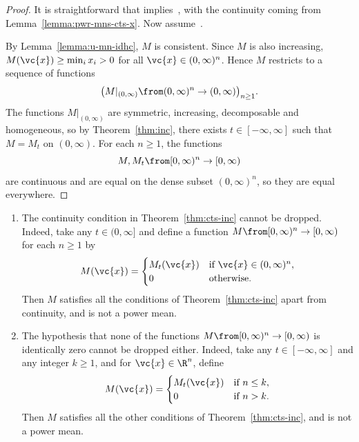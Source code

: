 \begin{proof}
It is straightforward that 
implies~, with the continuity coming from
Lemma~\ref{lemma:pwr-mns-cts-x}.  Now assume~.

By Lemma~\ref{lemma:u-mn-idhc}, $M$ is consistent.  Since $M$ is also
increasing, $M(\vc{x}) \geq \min_i x_i > 0$ for all $\vc{x} \in (0,
\infty)^n$.  Hence $M$ restricts to a sequence of functions
\[
\bigl( 
M|_{(0, \infty)} \from (0, \infty)^n \to (0, \infty) 
\bigr)_{n \geq 1}.
\]
The functions $M|_{(0, \infty)}$ are symmetric, increasing, decomposable
and homogeneous, so by Theorem~\ref{thm:inc}, there exists $t \in [-\infty,
\infty]$ such that $M = M_t$ on $(0, \infty)$.  For each $n \geq 1$,
the functions
\[
M, M_t \from [0, \infty)^n \to [0, \infty)
\]
are continuous and are equal on the dense subset $(0, \infty)^n$, so they
are equal everywhere. 
\end{proof}

\begin{remarks}
\begin{enumerate}
\item
The continuity condition in Theorem~\ref{thm:cts-inc} cannot be dropped.
Indeed, take any $t \in (0, \infty]$ and define a function $M \from [0,
\infty)^n \to [0, \infty)$ for each $n \geq 1$ by
\[
M(\vc{x})
=
\begin{cases}
M_t(\vc{x})     &\text{if } \vc{x} \in (0, \infty)^n,   \\
0               &\text{otherwise.}
\end{cases}
\]
Then $M$ satisfies all the conditions of
Theorem~\ref{thm:cts-inc} apart from continuity,
and is not a power mean.

\item
The hypothesis that none of the functions $M \from [0, \infty)^n \to [0,
    \infty)$ is identically zero cannot be dropped either.  Indeed, take
    any $t \in [-\infty, \infty]$ and any integer $k \geq 1$, and for
    $\vc{x} \in \R^n$, define
\[
M(\vc{x})
=
\begin{cases}
M_t(\vc{x})     &\text{if } n \leq k,   \\
0               &\text{if } n > k.
\end{cases}
\]
Then $M$ satisfies all the other conditions of
Theorem~\ref{thm:cts-inc}, and is not a power
mean.
\end{enumerate}
\end{remarks}



